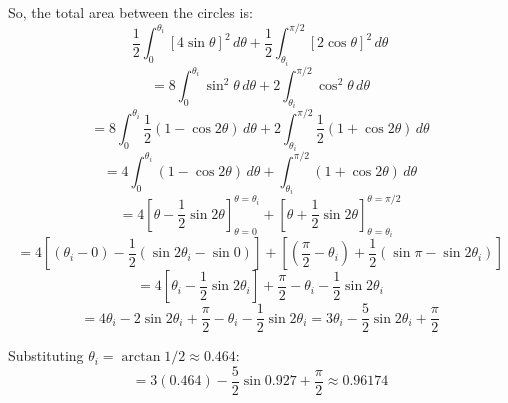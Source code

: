 \begin{Answer}[ref = polar5]
So, the total area between the circles is:
$$\frac{1}{2} \int_{0}^{\theta_i} \left[ 4\sin{\theta} \right]^2 \, d\theta + 
\frac{1}{2} \int_{\theta_i}^{\pi / 2} \left[ 2\cos{\theta} \right]^2 \, d
\theta$$
$$= 8 \int_{0}^{\theta_i} \sin^2{\theta} \, d\theta + 2 \int_{\theta_i}^{\pi / 
2} \cos^2{\theta} \, d\theta$$
$$= 8 \int_{0}^{\theta_i} \frac{1}{2} \left( 1 - \cos{2\theta} \right) \, d
\theta + 2 \int_{\theta_i}^{\pi / 2} \frac{1}{2} \left( 1 + \cos{2\theta} 
\right) \, d\theta$$
$$=4 \int_{0}^{\theta_i} \left( 1 - \cos{2\theta} \right) \, d\theta + \int_{
\theta_i}^{\pi / 2} \left( 1 + \cos{2\theta} \right) \, d\theta$$
$$= 4 \left[ \theta - \frac{1}{2} \sin{2\theta} \right]_{\theta = 0}^{\theta = 
\theta_i} + \left[ \theta + \frac{1}{2} \sin{2\theta} \right]_{\theta = \theta_
i}^{\theta = \pi / 2}$$
$$= 4 \left[ \left( \theta_i - 0 \right) - \frac{1}{2} \left( \sin{2\theta_i} -
\sin{0} \right) \right] + \left[ \left( \frac{\pi}{2} - \theta_i \right) + 
\frac{1}{2} \left( \sin{\pi} - \sin{2\theta_i} \right) \right]$$
$$= 4\left[ \theta_i - \frac{1}{2}\sin{2\theta_i} \right] + \frac{\pi}{2} - 
\theta_i - \frac{1}{2}\sin{2\theta_i}$$
$$= 4\theta_i - 2\sin{2\theta_i} + \frac{\pi}{2} - \theta_i - \frac{1}{2}\sin{
2\theta_i} = 3\theta_i - \frac{5}{2}\sin{2\theta_i} + \frac{\pi}{2}$$

Substituting $\theta_i = \arctan{1 / 2} \approx 0.464$:
$$= 3 (0.464) - \frac{5}{2}\sin{0.927} + \frac{\pi}{2} \approx 0.96174$$
\end{Answer}